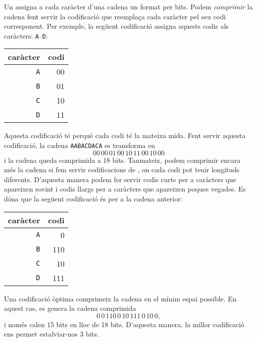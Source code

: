 
Un  assigna a cada caràcter
d'una cadena un  format per bits.
Podem \emph{comprimir} la cadena fent servir la codificació
que reemplaça cada caràcter pel
seu codi corresponent.
Per exemple, la següent codificació assigna aquests
codis als caràcters:
\texttt{A}–\texttt{D}:
\begin{centre}
\begin{tabular}{rr}
caràcter & codi \\
\hline
\texttt{A} & 00 \\
\texttt{B} & 01 \\
\texttt{C} & 10 \\
\texttt{D} & 11 \\
\end{tabular}
\end{centre}
Aquesta codificació té 
perquè cada codi té la mateixa mida.
Fent servir aquesta codificació, la cadena
\texttt{AABACDACA} es transforma en
\[00\,00\,01\,00\,10\,11\,00\,10\,00\]
i la cadena queda comprimida a 18 bits.
Tanmateix, podem comprimir encara més la cadena
si fem servir codificacions de , on
cada codi pot tenir longituds diferents.
D'aquesta manera podem fer servir codis curts per
a caràcters que apareixen sovint
i codis llargs per a caràcters que apareixen poques vegades.
Es dóna que la següent codificació és 
per a la cadena anterior:
\begin{centre}
\begin{tabular}{rr}
caràcter & codi \\
\hline
\texttt{A} & 0 \\
\texttt{B} & 110 \\
\texttt{C} & 10 \\
\texttt{D} & 111 \\
\end{tabular}
\end{centre}
Una codificació òptima comprimeix la cadena en el mínim
espai possible.
En aquest cas, es genera la cadena comprimida
\[0\,0\,110\,0\,10\,111\,0\,10\,0,\]
i només calen 15 bits en lloc de 18 bits.
D'aquesta manera, la millor codificació ens permet
estalviar-nos 3 bits.

